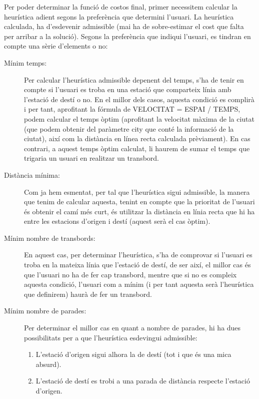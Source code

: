 \documentclass[a4paper,12pt]{article}
\begin{document}
            Per poder determinar la funció de costos final, primer necessitem calcular la heurística adient segons la preferència que determini l’usuari.
            La heurística calculada, ha d’esdevenir admissible (mai ha de sobre-estimar el cost que falta per arribar a la solució).
            Segons la preferència que indiqui l’usuari, es tindran en compte una sèrie d’elements o no:
            \begin{description}
                \item[Mínim temps:] Per calcular l’heurística admissible depenent del temps, s’ha de tenir en compte si l’usuari es troba en una estació que comparteix línia amb l’estació de destí o no. En el millor dels casos, aquesta condició es complirà i per tant, aprofitant la fórmula de VELOCITAT = ESPAI / TEMPS, podem calcular el temps òptim (aprofitant la velocitat màxima de la ciutat (que podem obtenir del paràmetre city que conté la informació de la ciutat), així com la distància en línea recta calculada prèviament).
                En cas contrari, a aquest temps òptim calculat, li haurem de sumar el temps que trigaria un usuari en realitzar un transbord.
                \item[Distància mínima:] Com ja hem esmentat, per tal que l’heurística sigui admissible, la manera que tenim de calcular aquesta, tenint en compte que la prioritat de l’usuari és obtenir el camí més curt, és utilitzar la distància en línia recta que hi ha entre les estacions d’origen i destí (aquest serà el cas òptim).
                \item[Mínim nombre de transbords:] En aquest cas, per determinar l’heurística, s’ha de comprovar si l’usuari es troba en la mateixa línia que l’estació de destí, de ser així, el millor cas és que l’usuari no ha de fer cap transbord, mentre que si no es compleix aquesta condició, l’usuari com a mínim (i per tant aquesta serà l’heurística que definirem) haurà de fer un transbord.
                \item[Mínim nombre de parades:] Per determinar el millor cas en quant a nombre de parades, hi ha dues possibilitats per a que l’heurística esdevingui admissible:
                \begin{enumerate}
                    \item L’estació d’origen sigui alhora la de destí (tot i que és una mica absurd).
                    \item L’estació de destí es trobi a una parada de distància respecte l’estació d’origen.

                \end{enumerate} 
            \end{description}
        
\end{document}
